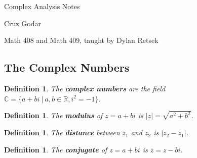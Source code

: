 \documentclass{article}
\theoremstyle{colontheorem}
\newtheorem{definition}[theorem]{Definition}
\newenvironment{Def}
{
	\begin{mdframed}[backgroundcolor=DefGreen!10]
	\begin{definition}
}
{
	\end{definition}
	\end{mdframed}
	
	\vspace{.15in}
}
\begin{document}
\vspace*{.5in}

\begin{center}
	\Huge Complex Analysis Notes\\
	
	\vspace{.25in}
	
	\Large Cruz Godar\\
	
	\vspace{.25in}
	
	\normalsize Math 408 and Math 409, taught by Dylan Retsek
\end{center}

\vspace{.5in}





\begin{center}
	\section{The Complex Numbers}
	\vspace{.1in}
\end{center}



\begin{Def}
	
	The \textbf{complex numbers} are the field $\mathbb{C} = \{a + bi\ |\ a, b \in \mathbb{R}, i^2 = -1\}$.
	
\end{Def}



\begin{Def}
	
	The \textbf{modulus} of $z = a+bi$ is $|z| = \sqrt{a^2 + b^2}$.
	
\end{Def}



\begin{Def}
	
	The \textbf{distance} between $z_1$ and $z_2$ is $|z_2 - z_1|$.
	
\end{Def}



\begin{Def}
	
	The \textbf{conjugate} of $z = a+bi$ is $\overline{z} = z - bi$.
	
\end{Def}
\end{document}
